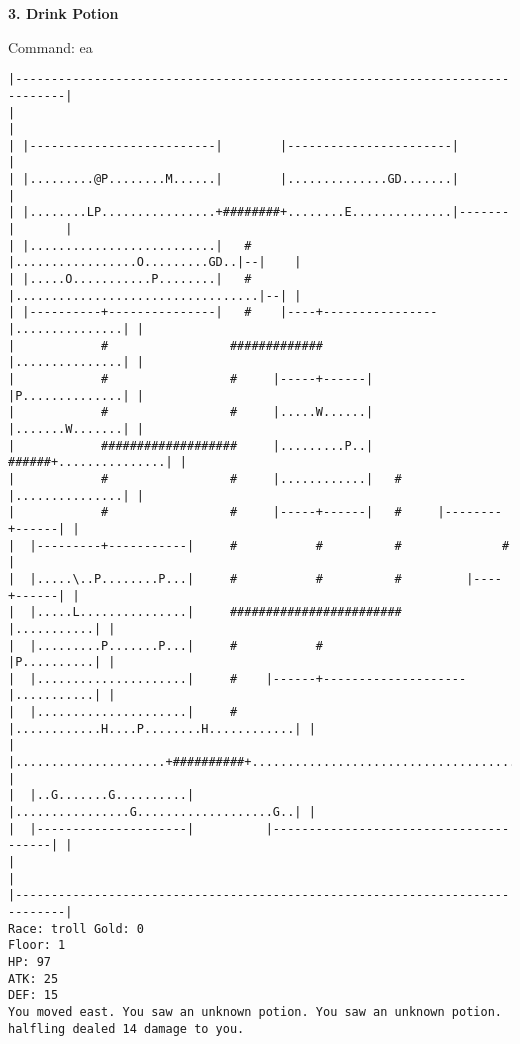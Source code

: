 \documentclass[11pt]{article}
\theoremstyle{plain}
\begin{document}
\vspace{1.0 in}

\textbf{3. Drink Potion}

Command: ea
\begin{Verbatim}[fontsize=\small]
|-----------------------------------------------------------------------------|
|                                                                             |
| |--------------------------|        |-----------------------|               |
| |.........@P........M......|        |..............GD.......|               |
| |........LP................+########+........E..............|-------|       |
| |..........................|   #    |.................O.........GD..|--|    |
| |.....O...........P........|   #    |..................................|--| |
| |----------+---------------|   #    |----+----------------|...............| |
|            #                 #############                |...............| |
|            #                 #     |-----+------|         |P..............| |
|            #                 #     |.....W......|         |.......W.......| |
|            ###################     |.........P..|   ######+...............| |
|            #                 #     |............|   #     |...............| |
|            #                 #     |-----+------|   #     |--------+------| |
|  |---------+-----------|     #           #          #              #        |
|  |.....\..P........P...|     #           #          #         |----+------| |
|  |.....L...............|     ########################         |...........| |
|  |.........P.......P...|     #           #                    |P..........| |
|  |.....................|     #    |------+--------------------|...........| |
|  |.....................|     #    |............H....P........H............| |
|  |.....................+##########+.......................................| |
|  |..G.......G..........|          |................G...................G..| |
|  |---------------------|          |---------------------------------------| |
|                                                                             |
|-----------------------------------------------------------------------------|
Race: troll Gold: 0                                                    Floor: 1
HP: 97
ATK: 25
DEF: 15
You moved east. You saw an unknown potion. You saw an unknown potion. halfling dealed 14 damage to you. 
\end{Verbatim}
\end{document}
